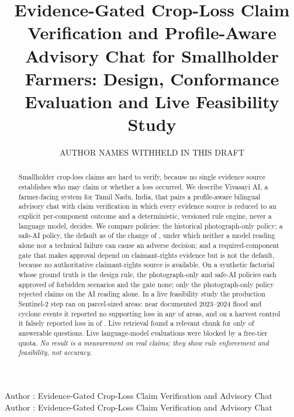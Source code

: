 \documentclass{ieeeaccess}
\begin{document}

\title{Evidence-Gated Crop-Loss Claim Verification and Profile-Aware Advisory Chat for Smallholder Farmers: Design, Conformance Evaluation and Live Feasibility Study}
\author{\uppercase{Author names withheld in this draft}}
\address[1]{Affiliations withheld in this draft}

\markboth
{Author \headeretal: Evidence-Gated Crop-Loss Claim Verification and Advisory Chat}
{Author \headeretal: Evidence-Gated Crop-Loss Claim Verification and Advisory Chat}


\begin{abstract}
Smallholder crop-loss claims are hard to verify, because no single evidence source establishes who may claim or whether a loss occurred. We describe Vivasayi AI, a farmer-facing system for Tamil Nadu, India, that pairs a profile-aware bilingual advisory chat with claim verification in which every evidence source is reduced to an explicit per-component outcome and a deterministic, versioned rule engine, never a language model, decides. We compare \PolicyCountWord{} policies: the historical photograph-only policy; a safe-AI policy, the default as of the change of \PolicySafeAiDate{}, under which neither a model reading alone nor a technical failure can cause an adverse decision; and a required-component gate that makes approval depend on claimant-rights evidence but is not the default, because no authoritative claimant-rights source is available. On a synthetic factorial whose ground truth is the design rule, the photograph-only and safe-AI policies each approved \FusionLegacyInvalidApprovals{} of \FusionInvalidApprovalDenominator{} forbidden scenarios and the gate none; only the photograph-only policy rejected claims on the AI reading alone. In a live feasibility study the production Sentinel-2 step ran on \SatLiveSquares{} parcel-sized areas: near \SatEventCountWord{} documented 2023--2024 flood and cyclone events it reported no supporting loss in any of \SatEventSquares{} areas, and on a harvest control it falsely reported loss in \SatControlSupports{} of \SatControlSquares{}. Live retrieval found a relevant chunk for only \RagAnswerableRelevantHits{} of \RagAnswerableQueries{} answerable questions. Live language-model evaluations were blocked by a free-tier quota. \emph{No result is a measurement on real claims; they show rule enforcement and feasibility, not accuracy.}
\end{abstract}
\end{document}
